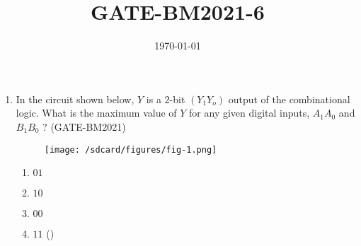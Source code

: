 \documentclass[12pt]{article}
\begin{document}
\title{GATE-BM2021-6}
\author{}
\date{\today}
\maketitle
\begin{enumerate}
\item In the circuit shown below, $Y$ is a $2$-bit $(Y_1Y_o)$ output of the combinational logic. What is the 
maximum value of $Y$ for any given digital inputs, $A_1A_0$ and $B_1B_0$ ?
		\hfill(GATE-BM2021)
\begin{figure}[H]
\centering
\texttt{[image: /sdcard/figures/fig-1.png]}
\caption{}
\label{fig:fig-1.png}
\end{figure}
\begin{enumerate}[label=(\Alph*)]
\item $01$
\item $10$
\item $00$
\item $11$
\hfill()
\end{enumerate}
\end{enumerate}
\end{document}
